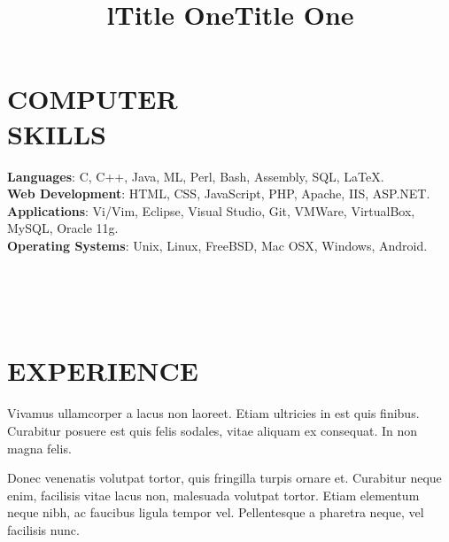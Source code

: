 \documentclass[mm]{simple_style}
\begin{document}
\begin{resume}
\sectionline

\section{COMPUTER\\SKILLS}

\textbf{Languages}: C, C++, Java, ML, Perl, Bash, Assembly, SQL, \LaTeX.
\\
\textbf{Web Development}: HTML, CSS, JavaScript, PHP, Apache, IIS, ASP.NET.
\\
\textbf{Applications}: Vi/Vim, Eclipse, Visual Studio, Git, VMWare, VirtualBox, 
MySQL, Oracle 11g.
\\
\textbf{Operating Systems}: 
Unix, Linux, FreeBSD, Mac OSX, Windows, Android.
\\
\sectionline

\begin{format}
\title{l}\\
\\
\body\\
\end{format}

\section{EXPERIENCE}
\title{\textbf{Title One}}
\begin{position}
Vivamus ullamcorper a lacus non laoreet. Etiam ultricies in est quis finibus. 
Curabitur posuere est quis felis sodales, vitae aliquam ex consequat. In non 
magna felis.
\end{position}

\title{\textbf{Title One}}
\begin{position}
Donec venenatis volutpat tortor, quis fringilla turpis ornare et. Curabitur 
neque enim, facilisis vitae lacus non, malesuada volutpat tortor. Etiam 
elementum neque nibh, ac faucibus ligula tempor vel. Pellentesque a pharetra 
neque, vel facilisis nunc.
\end{position}


\end{resume}
\end{document}
